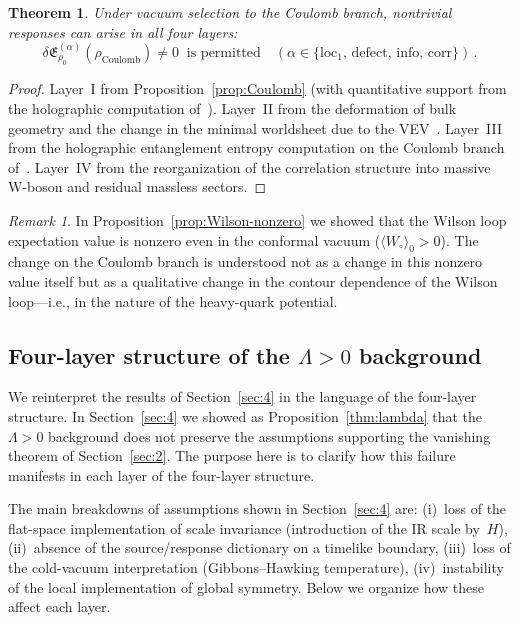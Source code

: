 \documentclass[
  aps,
  prd,
  preprint,
  groupedaddress,
  nofootinbib,
  longbibliography
]{revtex4-2}
\newtheorem{theorem}[definition]{Theorem}
\theoremstyle{remark}
\newtheorem{remark}[definition]{Remark}
\begin{document}
\begin{theorem}\label{thm:Coulomb-layers}
Under vacuum selection to the Coulomb branch, nontrivial
responses can arise in all four layers:
\begin{equation}\label{eq:Coulomb-response}
  \delta\mathfrak{E}_{\rho_0}^{(\alpha)}%
    (\rho_{\mathrm{Coulomb}})\neq 0
  \;\;\text{is permitted}
  \quad
  (\alpha\in\{\mathrm{loc}_1,\,\mathrm{defect},\,
    \mathrm{info},\,\mathrm{corr}\})\,.
\end{equation}
\end{theorem}

\begin{proof}
Layer~I from
Proposition~\ref{prop:Coulomb}
(with quantitative support from the holographic computation
of~\cite{ref45}).
Layer~II from the deformation of bulk geometry and the change in
the minimal worldsheet due to the VEV~\cite{ref28}.
Layer~III from the holographic entanglement entropy computation
on the Coulomb branch of~\cite{ref41}.
Layer~IV from the reorganization of the correlation structure
into massive W-boson and residual massless sectors.
\end{proof}

\begin{remark}\label{rem:Coulomb-Wilson}
In Proposition~\ref{prop:Wilson-nonzero} we showed that the
Wilson loop expectation value is nonzero even in the conformal
vacuum ($\langle W_\circ\rangle_0>0$).
The change on the Coulomb branch is understood not as a change
in this nonzero value itself but as a qualitative change in the
contour dependence of the Wilson loop---i.e., in the nature of
the heavy-quark potential.
\end{remark}

\subsection{Four-layer structure of the
  \texorpdfstring{$\Lambda>0$}{Lambda>0}
  background}\label{subsec:7-5}

We reinterpret the results of Section~\ref{sec:4} in the
language of the four-layer structure.
In Section~\ref{sec:4} we showed as Proposition~\ref{thm:lambda}
that the~$\Lambda>0$ background does not preserve the assumptions
supporting the vanishing theorem of Section~\ref{sec:2}.
The purpose here is to clarify how this failure manifests in each
layer of the four-layer structure.

The main breakdowns of assumptions shown in Section~\ref{sec:4}
are:
(i)~loss of the flat-space implementation of scale invariance
(introduction of the IR scale by~$H$),
(ii)~absence of the source/response dictionary on a timelike
boundary,
(iii)~loss of the cold-vacuum interpretation (Gibbons--Hawking
temperature),
(iv)~instability of the local implementation of global symmetry.
Below we organize how these affect each layer.
\end{document}
